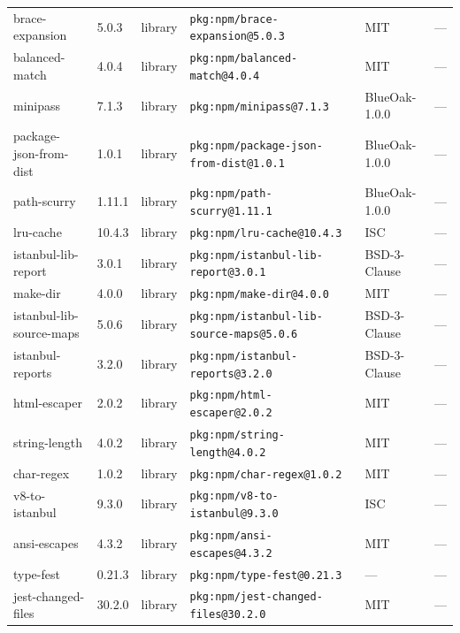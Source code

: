 \documentclass[11pt,a4paper]{article}
\begin{document}
\begin{longtable}{|p{4cm}|p{2cm}|p{1.6cm}|p{5cm}|p{1.5cm}|p{3.5cm}|}
\raggedright brace-expansion & 5.0.3 & library & \small\texttt{pkg:npm/brace-expansion@5.0.3} & MIT & \small — \\
\raggedright balanced-match & 4.0.4 & library & \small\texttt{pkg:npm/balanced-match@4.0.4} & MIT & \small — \\
\raggedright minipass & 7.1.3 & library & \small\texttt{pkg:npm/minipass@7.1.3} & BlueOak-1.0.0 & \small — \\
\raggedright package-json-from-dist & 1.0.1 & library & \small\texttt{pkg:npm/package-json-from-dist@1.0.1} & BlueOak-1.0.0 & \small — \\
\raggedright path-scurry & 1.11.1 & library & \small\texttt{pkg:npm/path-scurry@1.11.1} & BlueOak-1.0.0 & \small — \\
\raggedright lru-cache & 10.4.3 & library & \small\texttt{pkg:npm/lru-cache@10.4.3} & ISC & \small — \\
\raggedright istanbul-lib-report & 3.0.1 & library & \small\texttt{pkg:npm/istanbul-lib-report@3.0.1} & BSD-3-Clause & \small — \\
\raggedright make-dir & 4.0.0 & library & \small\texttt{pkg:npm/make-dir@4.0.0} & MIT & \small — \\
\raggedright istanbul-lib-source-maps & 5.0.6 & library & \small\texttt{pkg:npm/istanbul-lib-source-maps@5.0.6} & BSD-3-Clause & \small — \\
\raggedright istanbul-reports & 3.2.0 & library & \small\texttt{pkg:npm/istanbul-reports@3.2.0} & BSD-3-Clause & \small — \\
\raggedright html-escaper & 2.0.2 & library & \small\texttt{pkg:npm/html-escaper@2.0.2} & MIT & \small — \\
\raggedright string-length & 4.0.2 & library & \small\texttt{pkg:npm/string-length@4.0.2} & MIT & \small — \\
\raggedright char-regex & 1.0.2 & library & \small\texttt{pkg:npm/char-regex@1.0.2} & MIT & \small — \\
\raggedright v8-to-istanbul & 9.3.0 & library & \small\texttt{pkg:npm/v8-to-istanbul@9.3.0} & ISC & \small — \\
\raggedright ansi-escapes & 4.3.2 & library & \small\texttt{pkg:npm/ansi-escapes@4.3.2} & MIT & \small — \\
\raggedright type-fest & 0.21.3 & library & \small\texttt{pkg:npm/type-fest@0.21.3} & — & \small — \\
\raggedright jest-changed-files & 30.2.0 & library & \small\texttt{pkg:npm/jest-changed-files@30.2.0} & MIT & \small — \\

\end{longtable}
\end{document}

